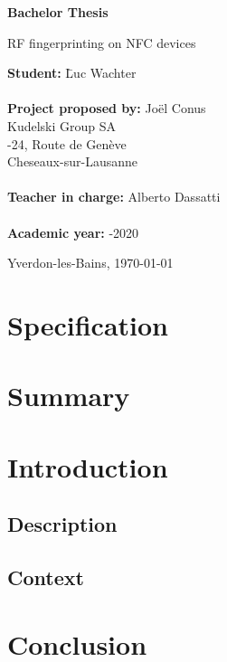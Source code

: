 \documentclass[paper=a4, fontsize=11pt]{scrartcl}
\begin{document}
\begin{titlepage}
  \thispagestyle{firstpage}
  \begin{center}
    \vspace*{5cm}

    \Huge
    \textbf{Bachelor Thesis}

    \vspace{1.5cm}
    \LARGE
    RF fingerprinting on NFC devices
  \end{center}

  \vspace{6cm}
  \begin{tabbing}
    \linespread{3}\textbf{Student:} \hspace{12em} \= Luc Wachter\\\\

    \textbf{Project proposed by:} \> Joël Conus\\
    \> Kudelski Group SA\\
    -24, Route de Genève\\
     Cheseaux-sur-Lausanne\\\\

    \textbf{Teacher in charge:} \> Alberto Dassatti\\\\

    \textbf{Academic year:} -2020
  \end{tabbing}

  \vspace{3cm}
  \begin{flushright}
    Yverdon-les-Bains, \today
  \end{flushright}
\end{titlepage}

\newpage
\section{Specification} %

\newpage
\renewcommand{\contentsname}{Table of contents}
\tableofcontents
\newpage

\section{Summary} %

\section{Introduction}
\subsection{Description}
\subsection{Context}

\section{Conclusion}
\end{document}
